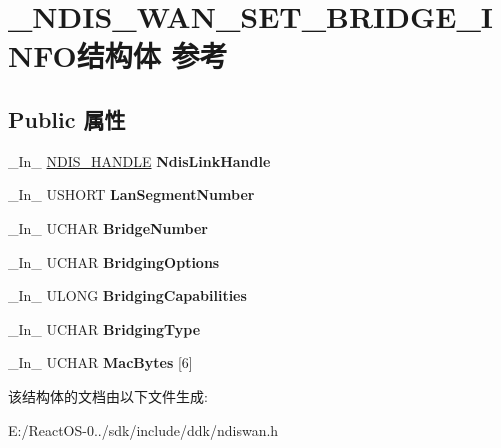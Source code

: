 \hypertarget{struct___n_d_i_s___w_a_n___s_e_t___b_r_i_d_g_e___i_n_f_o}{}\section{\+\_\+\+N\+D\+I\+S\+\_\+\+W\+A\+N\+\_\+\+S\+E\+T\+\_\+\+B\+R\+I\+D\+G\+E\+\_\+\+I\+N\+F\+O结构体 参考}
\label{struct___n_d_i_s___w_a_n___s_e_t___b_r_i_d_g_e___i_n_f_o}
\subsection*{Public 属性}
\begin{DoxyCompactItemize}
\item 
\mbox{\label{struct___n_d_i_s___w_a_n___s_e_t___b_r_i_d_g_e___i_n_f_o_ad1e106ccde93319361171376bb03a35f}} 
\+\_\+\+In\+\_\+ \hyperlink{interfacevoid}{N\+D\+I\+S\+\_\+\+H\+A\+N\+D\+LE} {\bfseries Ndis\+Link\+Handle}
\item 
\mbox{\label{struct___n_d_i_s___w_a_n___s_e_t___b_r_i_d_g_e___i_n_f_o_af6b435501531d689d2b5853ee5d7755d}} 
\+\_\+\+In\+\_\+ U\+S\+H\+O\+RT {\bfseries Lan\+Segment\+Number}
\item 
\mbox{\label{struct___n_d_i_s___w_a_n___s_e_t___b_r_i_d_g_e___i_n_f_o_ae5175077aeaec610c39fc63d4338129d}} 
\+\_\+\+In\+\_\+ U\+C\+H\+AR {\bfseries Bridge\+Number}
\item 
\mbox{\label{struct___n_d_i_s___w_a_n___s_e_t___b_r_i_d_g_e___i_n_f_o_afbec375dbc69682cd30c1ca9600ec1c3}} 
\+\_\+\+In\+\_\+ U\+C\+H\+AR {\bfseries Bridging\+Options}
\item 
\mbox{\label{struct___n_d_i_s___w_a_n___s_e_t___b_r_i_d_g_e___i_n_f_o_a951f68b2f952d966533bef86d547ab00}} 
\+\_\+\+In\+\_\+ U\+L\+O\+NG {\bfseries Bridging\+Capabilities}
\item 
\mbox{\label{struct___n_d_i_s___w_a_n___s_e_t___b_r_i_d_g_e___i_n_f_o_a27cf58cd9e02aeedb766cbc4473e318a}} 
\+\_\+\+In\+\_\+ U\+C\+H\+AR {\bfseries Bridging\+Type}
\item 
\mbox{\label{struct___n_d_i_s___w_a_n___s_e_t___b_r_i_d_g_e___i_n_f_o_a14d32c7f84cdad3b7e49ee65e7d5c5f3}} 
\+\_\+\+In\+\_\+ U\+C\+H\+AR {\bfseries Mac\+Bytes} \mbox{[}6\mbox{]}
\end{DoxyCompactItemize}


该结构体的文档由以下文件生成\+:\begin{DoxyCompactItemize}
\item 
E\+:/\+React\+O\+S-\/0../sdk/include/ddk/ndiswan.\+h\end{DoxyCompactItemize}
